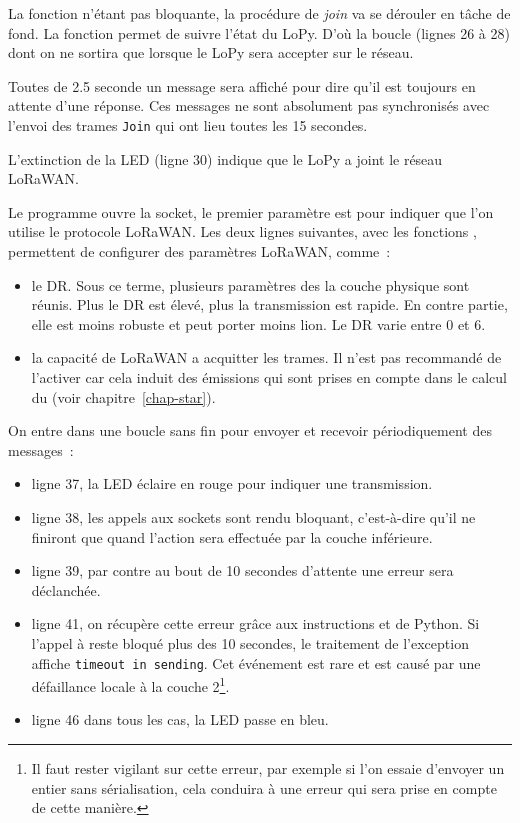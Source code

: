 La fonction  n'étant pas bloquante, la procédure de \textit{join} va se dérouler en tâche de fond. La fonction  permet de suivre l'état du LoPy. D'où la boucle (lignes 26 à 28) dont on ne sortira que lorsque le LoPy sera accepter sur le réseau. 

Toutes de 2.5 seconde un message sera affiché pour dire qu'il est toujours en attente d'une réponse. Ces messages ne sont absolument pas synchronisés avec l'envoi des trames \texttt{Join} qui ont lieu toutes les 15 secondes.

L'extinction de la LED (ligne 30) indique que le LoPy a joint le réseau LoRaWAN.


Le programme ouvre la socket, le premier paramètre est \texttt{} pour indiquer que l'on utilise le protocole LoRaWAN. Les deux lignes suivantes, avec les fonctions , permettent de configurer des paramètres LoRaWAN, comme~:
\begin{itemize}
\item le \ac{DR}. Sous ce terme, plusieurs paramètres des la couche physique sont réunis. Plus le \ac{DR} est élevé, plus la transmission est rapide. En contre partie, elle est moins robuste et peut porter moins lion. Le \ac{DR} varie entre 0 et 6.
\item la capacité de LoRaWAN a acquitter les trames. Il n'est pas recommandé de l'activer car cela induit des émissions qui sont prises en compte dans le calcul du  (voir chapitre~\vref{chap-star}).
\end{itemize}




On entre dans une boucle sans fin pour envoyer et recevoir périodiquement des messages~:
\begin{itemize}
    \item ligne 37, la LED éclaire en rouge pour indiquer une transmission.
    \item ligne 38, les appels aux sockets sont rendu bloquant, c'est-à-dire qu'il ne finiront que quand l'action sera effectuée par la couche inférieure.
    \item ligne 39, par contre au bout de 10 secondes d'attente une erreur sera déclanchée.
    \item ligne 41, on récupère cette erreur grâce aux instructions \texttt{} et \texttt{} de Python. Si l'appel à  reste bloqué plus des 10 secondes, le traitement de l'exception affiche \texttt{timeout in sending}. Cet événement est rare et est causé par une défaillance locale à la couche 2\footnote{Il faut rester vigilant sur cette erreur, par exemple si l'on essaie d'envoyer un entier sans sérialisation, cela conduira à une erreur qui sera prise en compte de cette manière.}.
    \item ligne 46 dans tous les cas, la LED passe en bleu.
\end{itemize}

